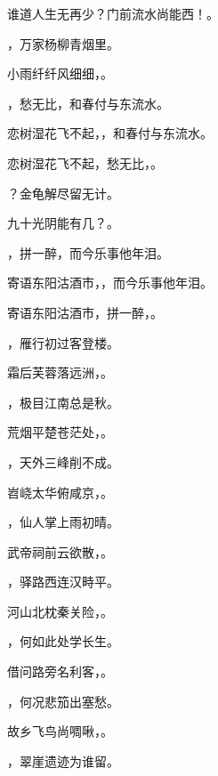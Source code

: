 \documentclass[12pt, a4paper, addpoints]{exam}
\begin{document}
\begin{questions}
\question[1] 谁道人生无再少？门前流水尚能西！\uline{\qquad\qquad\qquad}。

\question[1] \uline{\qquad\qquad\qquad}，万家杨柳青烟里。

\question[1] 小雨纤纤风细细，\uline{\qquad\qquad\qquad}。

\question[1] \uline{\qquad\qquad\qquad}，愁无比，和春付与东流水。

\question[1] 恋树湿花飞不起，\uline{\qquad\qquad\qquad}，和春付与东流水。

\question[1] 恋树湿花飞不起，愁无比，\uline{\qquad\qquad\qquad}。

\question[1] \uline{\qquad\qquad\qquad}？金龟解尽留无计。

\question[1] 九十光阴能有几？\uline{\qquad\qquad\qquad}。

\question[1] \uline{\qquad\qquad\qquad}，拼一醉，而今乐事他年泪。

\question[1] 寄语东阳沽酒市，\uline{\qquad\qquad\qquad}，而今乐事他年泪。

\question[1] 寄语东阳沽酒市，拼一醉，\uline{\qquad\qquad\qquad}。

\question[1] \uline{\qquad\qquad\qquad}，雁行初过客登楼。

\question[1] 霜后芙蓉落远洲，\uline{\qquad\qquad\qquad}。

\question[1] \uline{\qquad\qquad\qquad}，极目江南总是秋。

\question[1] 荒烟平楚苍茫处，\uline{\qquad\qquad\qquad}。

\question[1] \uline{\qquad\qquad\qquad}，天外三峰削不成。

\question[1] 岧峣太华俯咸京，\uline{\qquad\qquad\qquad}。

\question[1] \uline{\qquad\qquad\qquad}，仙人掌上雨初晴。

\question[1] 武帝祠前云欲散，\uline{\qquad\qquad\qquad}。

\question[1] \uline{\qquad\qquad\qquad}，驿路西连汉畤平。

\question[1] 河山北枕秦关险，\uline{\qquad\qquad\qquad}。

\question[1] \uline{\qquad\qquad\qquad}，何如此处学长生。

\question[1] 借问路旁名利客，\uline{\qquad\qquad\qquad}。

\question[1] \uline{\qquad\qquad\qquad}，何况悲笳出塞愁。

\question[1] 故乡飞鸟尚啁啾，\uline{\qquad\qquad\qquad}。

\question[1] \uline{\qquad\qquad\qquad}，翠崖遗迹为谁留。


\end{questions}
\end{document}
